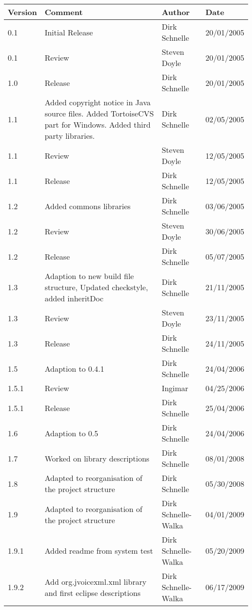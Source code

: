 \documentclass[11pt,a4paper]{article}
\begin{document}
\begin{tabular}{|l|p{5cm}|l|l|}
\hline
\textbf{Version} & \textbf{Comment} & \textbf{Author} & \textbf{Date} \\
\hline
\hline
0.1 & Initial Release & Dirk Schnelle & 20/01/2005 \\
\hline
0.1 & Review & Steven Doyle & 20/01/2005 \\
\hline
1.0 & Release & Dirk Schnelle & 20/01/2005 \\
\hline
1.1 & Added copyright notice in Java source files.
Added TortoiseCVS part for Windows.
Added third party libraries. & Dirk Schnelle & 
 02/05/2005 \\
\hline
1.1 & Review & Steven Doyle & 12/05/2005 \\
\hline
1.1 & Release & Dirk Schnelle & 12/05/2005 \\
\hline
1.2 & Added commons libraries & Dirk Schnelle & 03/06/2005 \\
\hline
1.2 & Review & Steven Doyle & 30/06/2005 \\
\hline
1.2 & Release & Dirk Schnelle & 05/07/2005 \\
\hline
1.3 & Adaption to new build file structure, Updated checkstyle, added 
inheritDoc & Dirk Schnelle & 21/11/2005 \\
\hline
1.3 & Review & Steven Doyle & 23/11/2005 \\
\hline
1.3 & Release & Dirk Schnelle & 24/11/2005 \\
\hline
1.5 & Adaption to 0.4.1  & Dirk Schnelle & 24/04/2006 \\
\hline
1.5.1 & Review & Ingimar  & 04/25/2006 \\
\hline
1.5.1 & Release  & Dirk Schnelle & 25/04/2006 \\
\hline
1.6 & Adaption to 0.5  & Dirk Schnelle & 24/04/2006 \\
\hline
1.7 & Worked on library descriptions  & Dirk Schnelle & 08/01/2008 \\
\hline
1.8 & Adapted to reorganisation of the project structure & Dirk Schnelle &
05/30/2008 \\
\hline
1.9 & Adapted to reorganisation of the project structure & Dirk Schnelle-Walka &
04/01/2009 \\
\hline
1.9.1 & Added readme from system test & Dirk Schnelle-Walka &
05/20/2009 \\
\hline
\hline
1.9.2 & Add org.jvoicexml.xml library and first eclipse descriptions & Dirk
Schnelle-Walka & 06/17/2009 \\
\end{tabular}




\end{document}
